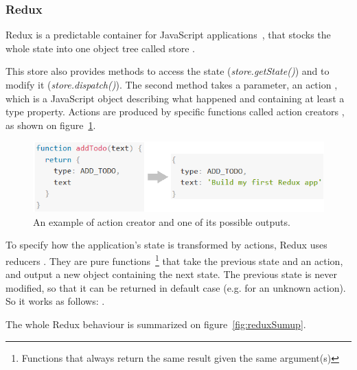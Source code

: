 \subsubsection{Redux}
\label{sssec:redux}

Redux is a predictable container for JavaScript applications~\cite{reduxDoc}, that stocks the whole state into one object tree called \guillemotleft{} store \guillemotright{}.

This store also provides methods to access the state (\textit{store.getState()}) and to modify it (\textit{store.dispatch()}). The second method takes a parameter, an \guillemotleft{} action \guillemotright{}, which is a JavaScript object describing what happened and containing at least a type property. Actions are produced by specific functions called \guillemotleft{} action
creators \guillemotright{}, as shown on {\sc figure}~\ref{fig:action}.

\begin{figure}[H]
    \centering
    \includegraphics[scale=0.9]{figure/action.png}
    \caption{An example of action creator and one of its possible outputs.}
    \label{fig:action}
\end{figure}

To specify how the application's state is transformed by actions, Redux uses \guillemotleft{} reducers \guillemotright{}. They are pure functions~\footnote{Functions that always return the same result given the same argument(s)} that take the previous state and an action, and output a new object containing the next state. The previous state is never modified, so that it can be returned in default case (e.g. for an unknown action). So it works as follows: .

The whole Redux behaviour is summarized on {\sc figure}~\ref{fig:reduxSumup}.

